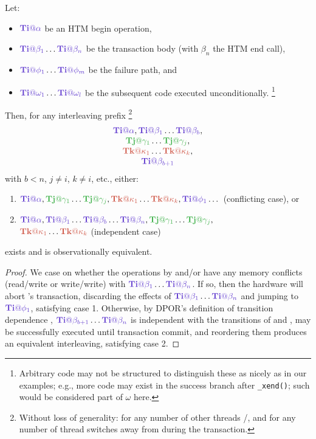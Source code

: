 \documentclass[10pt]{sigplanconf}
\begin{document}
\begin{lemma}
	\label{lem:equiv}
	Let:
	\begin{itemize}
		\item $\tiiat{\alpha}$ be an HTM begin operation,
		\item $\tiiat{\beta_1}\dots\tiiat{\beta_n}$ be the transaction body (with $\beta_n$ the HTM end call),
		\item $\tiiat{\phi_1}\dots\tiiat{\phi_m}$ be the failure path, and
		\item $\tiiat{\omega_1}\dots\tiiat{\omega_l}$ be the subsequent code executed unconditionally.%
			\footnote{Arbitrary code may not be structured to distinguish these as nicely as in our examples;
			e.g., more code may exist in the success branch after {\tt \_xend()};
			such would be considered part of $\omega$ here.}
	\end{itemize}
	Then, for any interleaving prefix%
	\footnote{Without loss of generality: for any number of other threads \tjj/\tkk,
	and for any number of thread switches away from \tii during the transaction.}
	\[
	\begin{tabular}{c}
		$\tiiat{\alpha},\tiiat{\beta_1}\dots\tiiat{\beta_b},$\\
		$\tjjat{\gamma_1}\dots\tjjat{\gamma_j},$ \\
		$\tkkat{\kappa_1}\dots\tkkat{\kappa_k},$ \\
		$\tiiat{\beta_{b+1}}$ %
	\end{tabular}
	\]
	with $b<n$, $j \ne i$, $k \ne i$, etc., either:
	\begin{enumerate}
		\item $\tiiat{\alpha},\tjjat{\gamma_1}\dots\tjjat{\gamma_j},\tkkat{\kappa_1}\dots\tkkat{\kappa_k},\tiiat{\phi_1}\dots$
			(conflicting case), or
		\item $\tiiat{\alpha},\tiiat{\beta_1}\dots\tiiat{\beta_b}\dots\tiiat{\beta_n},\tjjat{\gamma_1}\dots\tjjat{\gamma_j},$ \\
			$\tkkat{\kappa_1}\dots\tkkat{\kappa_k}$
			(independent case)
	\end{enumerate}
	exists and is observationally equivalent.
\end{lemma}

\begin{proof}
	We case on whether the operations by \tjj and/or \tkk have any memory conflicts (read/write or write/write)
	with $\tiiat{\beta_1}\dots\tiiat{\beta_n}$.
	If so, then the hardware will abort \tii's transaction, discarding the effects of $\tiiat{\beta_1}\dots\tiiat{\beta_n}$
	and jumping to $\tiiat{\phi_1}$,
	satisfying case 1.
	Otherwise, by DPOR's definition of transition dependence \cite{dpor}, %
	$\tiiat{\beta_{b+1}}\dots\tiiat{\beta_n}$ is independent with the transitions of \tjj and \tkk,
	may be successfully executed until transaction commit,
	and reordering them produces an equivalent interleaving,
	satisfying case 2.
\end{proof}
\end{document}
